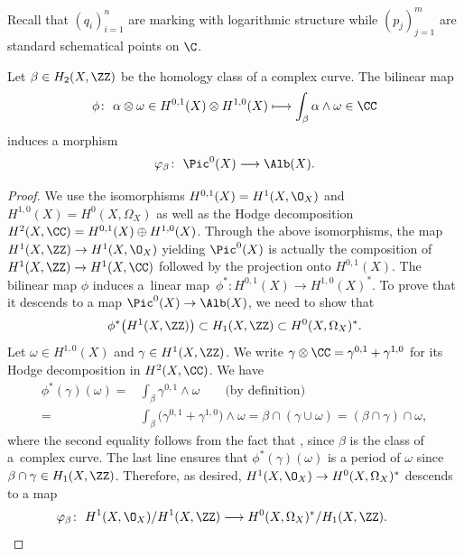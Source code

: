 Recall that $(q_i)_{i=1}^n$ are marking with logarithmic structure while $(p_j)_{j=1}^m$ are standard schematical points on $\C$.

\begin{lem}\label{lem:mapphibeta}
Let $\beta\in H_2(X,\ZZ)$ be the homology class of a complex curve. The bilinear map
\[ \phi \colon\ \alpha\otimes\omega\in H^{0,1}(X)\otimes H^{1,0}(X)\longmapsto \int_\beta \alpha\wedge \omega\in\CC \]
induces a morphism
\[ \varphi_\beta \colon\ \Pic^0(X)\longrightarrow \Alb(X). \]
\end{lem}
\begin{proof}
We use the isomorphisms $H^{0,1}(X)=H^1(X,\O_X)$ and $H^{1,0}(X)=H^0(X,\Omega_X)$ as well as the Hodge decomposition $H^2(X,\CC)=H^{0,1}(X)\oplus H^{1,0}(X)$. Through the above isomorphisms, the map $H^1(X,\ZZ)\to H^1(X,\O_X)$ yielding $\Pic^0(X)$ is actually the composition of $H^1(X,\ZZ)\to H^1(X,\CC)$ followed by the projection onto $H^{0,1}(X)$.
The bilinear map $\phi$ induces a~linear map~${\phi^*\colon H^{0,1}(X)\to H^{1,0}(X)^*}$. To prove that it descends to a map $\Pic^0(X)\to\Alb(X)$, we need to show that
\[ \phi^*\bigl(H^1(X,\ZZ)\bigr)\subset H_1(X,\ZZ)\subset H^0(X,\Omega_X)^*. \]
Let $\omega\in H^{1,0}(X)$ and $\gamma\in H^1(X,\ZZ)$. We write $\gamma\otimes\CC=\gamma^{0,1}+\gamma^{1,0}$ for its Hodge decomposition in $H^2(X,\CC)$. We have
\begin{align*}
\phi^*(\gamma)(\omega) = {}& \int_\beta \gamma^{0,1}\wedge\omega \qquad\text{(by definition)}\\
={} & \int_\beta \bigl(\gamma^{0,1}+\gamma^{1,0}\bigr)\wedge\omega
= \beta\cap (\gamma\cup\omega)
= (\beta\cap\gamma)\cap\omega,
\end{align*}
where the second equality follows from the fact that , since $\beta$ is the class of a~complex curve. The last line ensures that $\phi^*(\gamma)(\omega)$ is a period of $\omega$ since $\beta\cap\gamma\in H_1(X,\ZZ)$. Therefore, as desired, $H^1(X,\O_X)\to H^0(X,\Omega_X)^*$ descends to a map
\[ \varphi_\beta \colon\ H^1(X,\O_X)/H^1(X,\ZZ)\longrightarrow H^0(X,\Omega_X)^*/H_1(X,\ZZ). \tag*{\qed}
\]\renewcommand{\qed}{}
\end{proof}

